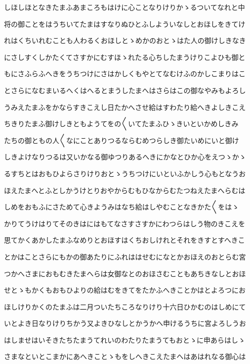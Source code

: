 \documentclass[a4paper,11pt,landscape]{ltjtarticle}
\begin{document}
しほしほとなきたまふあまころもはけに心ことなりけりかゝるついてなれと中
\par\medskip
将の御ことをはうちいてたまはすなりぬひとふしよういなしとおほしをきてけ
\par\medskip
れはくちいれむことも人わるくおほしとゝめかのおとゝはた人の御けしきなき
\par\medskip
にさしすくしかたくてさすかにむすほゝれたる心ちしたまうけりこよひも御と
\par\medskip
もにさふらふへきをうちつけにさはかしくもやとてなむけふのかしこまりはこ
\par\medskip
とさらになむまいるへくはへるとまうしたまへはさらはこの御なやみもよろし
\par\medskip
うみえたまふをかならすきこえし日たかへさせ給はすわたり給へきよしきこえ
\par\medskip
ちきりたまふ御けしきともようてをの〱いてたまふひゝきいといかめしきみ
\par\medskip
たちの御ともの人〱なにことありつるならむめつらしき御たいめにいと御け
\par\medskip
しきよけなりつるは又いかなる御ゆつりあるへきにかなとひか心をえつゝかゝ
\par\medskip
るすちとはおもひよらさりけりおとゝうちつけにいといふかしう心もとなうお
\par\medskip
ほえたまへとふとしかうけとりおやからむもひなからむたつねえたまへらむは
\par\medskip
しめをおもふにさためて心きようみはなち給はしやむことなきかた〱をはゝ
\par\medskip
かりてうけはりてそのきはにはもてなさすさすかにわつらはしう物のきこえを
\par\medskip
思てかくあかしたまふなめりとおほすはくちおしけれとそれをきすとすへきこ
\par\medskip
とかはことさらにもかの御あたりにふれははせむになとかおほえのおとらむ宮
\par\medskip
つかへさまにおもむきたまへらは女御なとのおほさむこともあちきなしとおほ
\par\medskip
せとゝもかくもおもひよりの給はむをきてをたかふへきことかはとよろつにお
\par\medskip
ほしけりかくのたまふは二月ついたちころなりけり十六日ひかむのはしめにて
\par\medskip
いとよき日なりけりちかう又よきひなしとかうかへ申けるうちに宮よろしうお
\par\medskip
はしませはいそきたちたまうてれいのわたりたまうてもおとゝに申あらはしゝ
\par\medskip
さまなといとこまかにあへきことゝもをしへきこえたまへはあはれなる御心は
\end{document}

